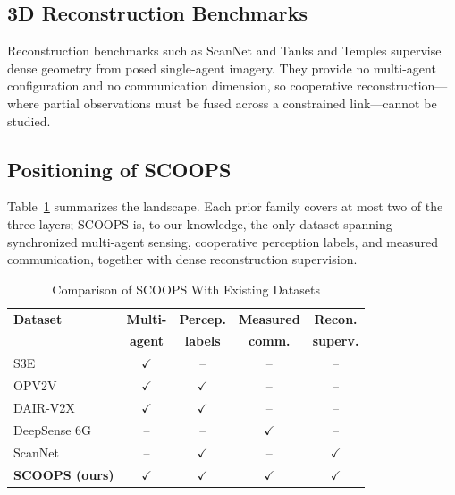 \documentclass[conference]{IEEEtran}
\newcommand{\cmark}{$\checkmark$}
\newcommand{\xmark}{--}
\begin{document}
\subsection{3D Reconstruction Benchmarks}
Reconstruction benchmarks such as ScanNet \cite{scannet} and Tanks and
Temples \cite{tanksandtemples} supervise dense geometry from posed
single-agent imagery. They provide no multi-agent configuration and no
communication dimension, so cooperative reconstruction---where partial
observations must be fused across a constrained link---cannot be studied.

\subsection{Positioning of SCOOPS}
Table~\ref{tab:comparison} summarizes the landscape. Each prior family
covers at most two of the three layers; SCOOPS is, to our knowledge, the
only dataset spanning synchronized multi-agent sensing, cooperative
perception labels, and measured communication, together with dense
reconstruction supervision.

\begin{table}[htbp]
\caption{Comparison of SCOOPS With Existing Datasets}
\begin{center}
\begin{tabular}{lcccc}
\toprule
\textbf{Dataset} & \textbf{Multi-} & \textbf{Percep.} & \textbf{Measured} & \textbf{Recon.} \\
 & \textbf{agent} & \textbf{labels} & \textbf{comm.} & \textbf{superv.} \\
\midrule
S3E \cite{s3e}                     & \cmark & \xmark & \xmark & \xmark \\
OPV2V \cite{opv2v}                 & \cmark & \cmark & \xmark & \xmark \\
DAIR-V2X \cite{dairv2x}            & \cmark & \cmark & \xmark & \xmark \\
DeepSense 6G \cite{deepsense6g}    & \xmark & \xmark & \cmark & \xmark \\
ScanNet \cite{scannet}             & \xmark & \cmark & \xmark & \cmark \\
\textbf{SCOOPS (ours)}             & \cmark & \cmark & \cmark & \cmark \\
\bottomrule
\end{tabular}
\label{tab:comparison}
\end{center}
\end{table}
\end{document}
